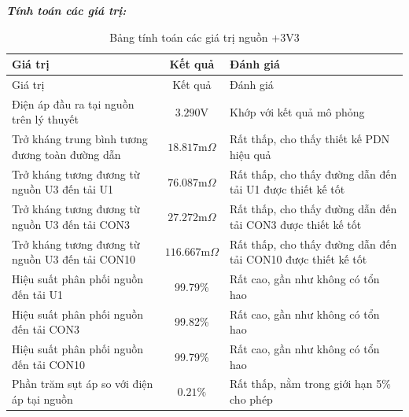             \textbf{\textit{Tính toán các giá trị:}}
            \begin{longtable}{|p{}|c|p{}|}           
                \caption{Bảng tính toán các giá trị nguồn +3V3}\\
                \hline
                Giá trị & Kết quả & Đánh giá \\
                \hline
                \endfirsthead
                
                \hline
                Giá trị & Kết quả & Đánh giá \\
                \hline
                \endhead
                
                \hline
                \endfoot
                
                \hline
                \endlastfoot
                
                Điện áp đầu ra tại nguồn trên lý thuyết & $3.290\text{V}$ & Khớp với kết quả mô phỏng \\
                Trở kháng trung bình tương đương toàn đường dẫn & $18.817 \text{m}\Omega$ & Rất thấp, cho thấy thiết kế PDN hiệu quả \\
                Trở kháng tương đương từ nguồn U3 đến tải U1 & $76.087 \text{m}\Omega$ & Rất thấp, cho thấy đường dẫn đến tải U1 được thiết kế tốt \\
                Trở kháng tương đương từ nguồn U3 đến tải CON3 & $27.272 \text{m}\Omega$ & Rất thấp, cho thấy đường dẫn đến tải CON3 được thiết kế tốt \\
                Trở kháng tương đương từ nguồn U3 đến tải CON10 & $116.667 \text{m}\Omega$ & Rất thấp, cho thấy đường dẫn đến tải CON10 được thiết kế tốt \\
                Hiệu suất phân phối nguồn đến tải U1 & 99.79\% & Rất cao, gần như không có tổn hao \\
                Hiệu suất phân phối nguồn đến tải CON3 & 99.82\% & Rất cao, gần như không có tổn hao \\
                Hiệu suất phân phối nguồn đến tải CON10 & 99.79\% & Rất cao, gần như không có tổn hao \\
                Phần trăm sụt áp so với điện áp tại nguồn & $\mathbf{0.21\%}$ & Rất thấp, nằm trong giới hạn 5\% cho phép
                \label{tab:3v3_calculation}\\

                \hline
            \end{longtable}
            
